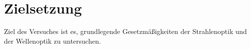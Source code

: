 \section{Zielsetzung}
\label{sec:zielsetzung}
Ziel des Versuches ist es, grundlegende Gesetzmäßigkeiten der Strahlenoptik und der Wellenoptik zu untersuchen.